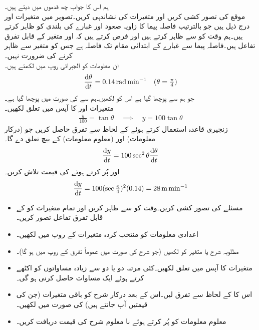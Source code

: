 ہم اس کا جواب چھ قدموں میں دیتے ہیں۔\\
\quad 
موقع کی تصور کشی کریں اور متغیرات کی نشاندہی کریں۔تصویر میں متغیرات  اور  درج ذیل ہیں جو بالترتیب فاصلہ پیما کا زاویہ صعود اور غبارے کی بلندی کو ظاہر کرتے ہیں۔ہم وقت کو  سے ظاہر کرتے ہیں اور فرض کرتے ہیں کہ  اور  متغیر  کے قابل تفرق تفاعل ہیں۔فاصلہ پیما سے غبارے کے ابتدائی مقام تک فاصلہ  ہے جس کو متغیر سے ظاہر کرنے کی ضرورت نہیں۔\\
\quad
ان معلومات کو الجبرائی روپ میں لکھتے ہیں۔
\begin{align*}
\frac{\dif \theta}{\dif t}=\SI{0.14}{\radian\per\minute}&& (\theta=\tfrac{\pi}{4})
\end{align*}
 \quad
جو ہم سے پوچھا گیا ہے اس کو لکھیں۔ہم سے  کی صورت میں  پوچھا گیا ہے۔\\
\quad
متغیرات   اور  کا آپس میں تعلق لکھیں۔
\begin{align*}
\frac{y}{100}=\tan\theta\quad \implies \quad y=100\tan\theta
\end{align*}
\quad
زنجیری قاعدہ استعمال کرتے ہوئے  کے لحاظ سے تفرق حاصل کریں جو  (درکار معلومات) اور  (معلوم معلومات)  کے بیچ تعلق دے گا۔
\begin{align*}
\frac{\dif y}{\dif t}=100\sec^2\theta\frac{\dif \theta}{\dif t}
\end{align*}
\quad
{} اور  پُر کرتے ہوئے  کی قیمت تلاش کریں۔
\begin{align*}
\frac{\dif y}{\dif t}=100(\sec\tfrac{\pi}{4})^2(0.14)=\SI{28}{\meter\per\minute}
\end{align*}

\begin{itemize}

\item
مسئلے کی تصور کشی کریں۔وقت کو  سے ظاہر کریں اور تمام متغیرات کو  کے قابل تفرق تفاعل تصور کریں۔
\item
اعدادی معلومات کو منتخب کردہ متغیرات کے روپ میں لکھیں۔
\item
مطلوبہ شرح یا متغیر کو لکھیں (جو شرح کی صورت میں عموماً تفرق کے روپ میں ہو گا)۔
\item
متغیرات کا آپس میں تعلق لکھیں۔کئی  مرتبہ   دو یا دو سے زیادہ مساواتوں کو اکٹھے کرتے ہوئے ایک مساوات حاصل کرنی ہو گی۔
\item
اس کا  کے لحاظ سے تفرق لیں۔اس کے بعد درکار شرح کو باقی متغیرات (جن کی قیمتیں آپ جانتے ہیں) کی صورت میں لکھیں۔
\item
معلوم معلومات کو پُر کرتے ہوئے نا معلوم شرح کی قیمت دریافت کریں۔
\end{itemize}


